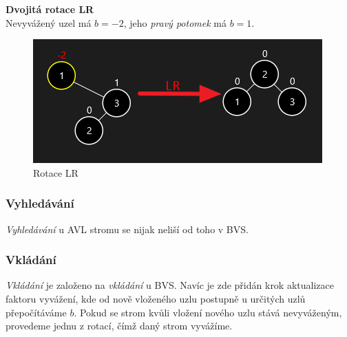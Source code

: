 \documentclass[
  biblatex=false,
  font=serif,
  glossaries=false,
  tables=false,
  theorems=false,
  index
]{kidiplom}
\begin{document}
\noindent\textbf{Dvojitá rotace LR}\\
\noindent Nevyvážený uzel má $b = -2$, jeho \textit{pravý potomek} má $b = 1$.
\begin{figure}[h!]
\centering
	\includegraphics[scale=0.8]{obrazky/14LR.png}
	\caption{Rotace LR}
\end{figure}

\subsubsection{Vyhledávání}
\indent\indent \textit{Vyhledávání} u AVL stromu se nijak neliší od toho v BVS.

\subsubsection{Vkládání}
\indent\indent \textit{Vkládání} je založeno na \textit{vkládání} u BVS. Navíc je zde přidán krok aktualizace faktoru vyvážení, kde od nově vloženého uzlu postupně u určitých uzlů přepočítáváme $b$. Pokud se strom kvůli vložení nového uzlu stává nevyváženým, provedeme jednu z rotací, čímž daný strom vyvážíme.\\
\end{document}
